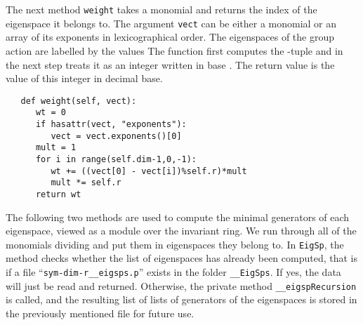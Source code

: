 \vspace{5pt}

\noindent The next method \texttt{weight} takes a monomial and returns the index of the eigenspace it belongs to. The argument \texttt{vect} can be either a monomial or an array of its exponents in lexicographical order.
 The eigenspaces  of the group action  are labelled by the  values  The function first computes the -tuple  and in the next step treats it as an integer written in base . The return value is the value of this integer in decimal base. 

\singlespacing
\begin{verbatim}
   def weight(self, vect):
      wt = 0
      if hasattr(vect, "exponents"):
         vect = vect.exponents()[0]
      mult = 1
      for i in range(self.dim-1,0,-1):
         wt += ((vect[0] - vect[i])%self.r)*mult
         mult *= self.r
      return wt
\end{verbatim}

\vspace{5pt}

\noindent The following two methods are used to compute the minimal generators of each eigenspace, viewed as a module over the invariant ring. We run through all of the monomials dividing  and put them in eigenspaces they belong to. In \texttt{EigSp}, the method checks whether the list of eigenspaces has already been computed, that is if a file ``\texttt{sym-dim-r\_\_eigsps.p}'' exists in the folder \texttt{\_\_EigSps}. If yes, the data will just be read and returned. Otherwise, the private method \texttt{\_\_eigspRecursion} is called, and the resulting list of lists of generators of the eigenspaces is stored in the previously mentioned file for future use.

